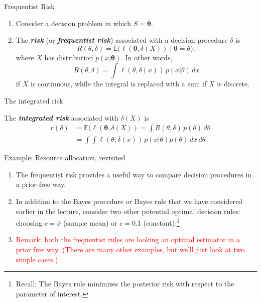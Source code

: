 \documentclass[
  ignorenonframetext,
]{beamer}
\providecommand{\tightlist}{%
  \setlength{\itemsep}{0pt}\setlength{\parskip}{0pt}}
\newcommand{\btheta}{{\bm\theta}}
\newcommand{\term}[1]{\textit{\textbf{#1}}}
\newcommand{\E}{\mathbb{E}}
\begin{document}
\begin{frame}{Frequentist Risk}
\protect\hypertarget{frequentist-risk}{}

\begin{enumerate}
\tightlist
\item
  Consider a decision problem in which \(S = \btheta\).
\item
  The \term{risk} (or \term{frequentist risk}) associated with a
  decision procedure \(\delta\) is
  \[ R(\theta,\delta) = \E\big(\ell(\btheta,\delta(X))\mid\btheta =\theta\big),\]
  where \(X\) has distribution \(p(x|\btheta)\). In other words,
  \[ R(\theta,\delta) = \int \ell(\theta,\delta(x))\,p(x|\theta)\,dx\]
  if \(X\) is continuous, while the integral is replaced with a sum if
  \(X\) is discrete.
\end{enumerate}

\end{frame}

\begin{frame}{The integrated risk}
\protect\hypertarget{the-integrated-risk}{}

The \term{integrated risk} associated with \(\delta(X)\) is
\begin{align}
r(\delta) &= \E(\ell(\btheta,\delta(X)) = \int R(\theta,\delta)\,p(\theta)\,d\theta \\
&= \int \int \ell(\theta,\delta(x))\,p(x|\theta)p(\theta)\,dx \,d\theta
\end{align}

\end{frame}

\begin{frame}{Example: Resource allocation, revisited}
\protect\hypertarget{example-resource-allocation-revisited}{}

\begin{enumerate}
\tightlist
\item
  The frequentist risk provides a useful way to compare decision
  procedures in a prior-free way.
\item
  In addition to the Bayes procedure or Bayes rule that we have
  considered earlier in the lecture, consider two other potential
  optimal decision rules: choosing \(c = \bar x\) (sample mean) or
  \(c=0.1\)
  (constant).\footnote{Recall: The Bayes rule minimizes the posterior risk with respect to the parameter of interest.}
\item
  \textcolor{red}{Remark: both the frequentist rules are looking an optimal estimator in a prior free way. (There are many other examples, but we'll just look at two simple cases.)}
\end{enumerate}

\end{frame}
\end{document}
